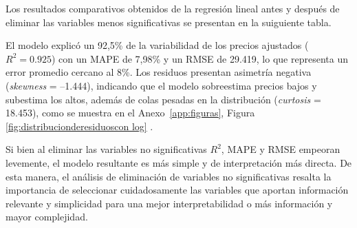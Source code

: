 Los resultados comparativos obtenidos de la regresión lineal antes y después de eliminar las variables menos significativas se presentan en la suiguiente tabla.
 
\begin{table}[H]
  \centering
  \caption[Resultados Regresiones]{Resultados de la Regresión Lineal Multivariable con y sin eliminación de variables.}
  \label{tab:regresiones}
\end{table}



El modelo explicó un 92,5\% de la variabilidad de los precios ajustados ($R^2=0.925$) con un MAPE de 7,98\% y un RMSE de 29.419, lo que representa un error promedio cercano al 8\%. Los residuos presentan asimetría negativa (\textit{skewness} = –1.444), indicando que el modelo sobreestima precios bajos y subestima los altos, además de colas pesadas en la distribución (\textit{curtosis} = 18.453), como se muestra en el Anexo~\ref{app:figuras}, Figura \ref{fig:distribucionderesiduoscon log}
. 

Si bien al eliminar las variables no significativas $R^2$, MAPE y RMSE empeoran levemente, el modelo resultante es más simple y de interpretación más directa. De esta manera, el análisis de eliminación de variables no significativas resalta la importancia de seleccionar cuidadosamente las variables que aportan información relevante y simplicidad para una mejor interpretabilidad o más información y mayor complejidad.\\